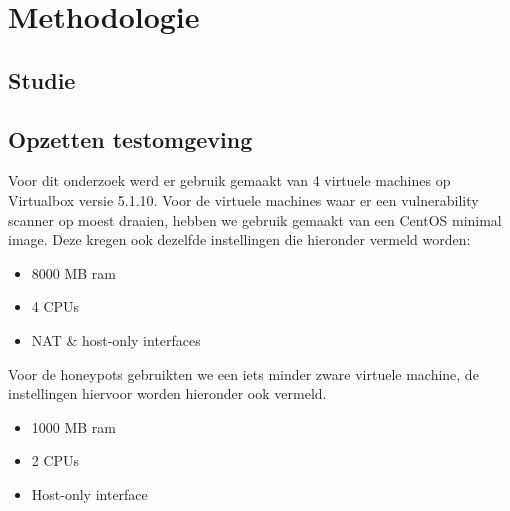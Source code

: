 
\chapter{Methodologie}
\label{ch:methodologie}



\section{Studie}


\section{Opzetten testomgeving}

Voor dit onderzoek werd er gebruik gemaakt van 4 virtuele machines op Virtualbox versie 5.1.10. Voor de virtuele machines waar er een vulnerability scanner op moest draaien, hebben we gebruik gemaakt van een CentOS minimal image. Deze kregen ook dezelfde instellingen die hieronder vermeld worden:

\begin{itemize}
\item 8000 MB ram
\item 4 CPUs
\item NAT \& host-only interfaces
\end{itemize}

Voor de honeypots gebruikten we een iets minder zware virtuele machine, de instellingen hiervoor worden hieronder ook vermeld. 

\begin{itemize}
\item 1000 MB ram
\item 2 CPUs
\item Host-only interface
\end{itemize}

